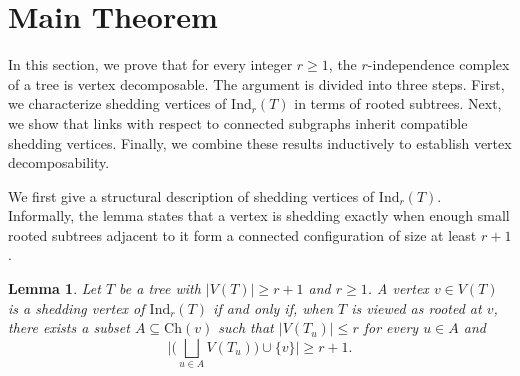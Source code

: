 \documentclass[12pt,reqno]{amsart}
\newtheorem{lemma}[theorem]{Lemma}
\theoremstyle{definition}
\def\Ind{\mathrm{Ind}}
\begin{document}
\section{Main Theorem}\label{sec: 3}

In this section, we prove that for every integer $r \ge 1$, the $r$-independence complex of a tree is vertex decomposable. The argument is divided into three steps. First, we characterize shedding vertices of $\Ind_r(T)$ in terms of rooted subtrees.
Next, we show that links with respect to connected subgraphs
inherit compatible shedding vertices. Finally, we combine these
results inductively to establish vertex decomposability. 

We first give a structural description of shedding vertices of $\Ind_r(T)$. Informally, the lemma states that a vertex is shedding exactly when enough small rooted subtrees adjacent to it form a connected configuration of size at least $r+1$.

\begin{lemma}\label{lem: all shedding vertices}
Let $T$ be a tree with $|V(T)| \ge r+1$ and $r \ge 1$. A vertex $v \in V(T)$ is a shedding vertex of $\Ind_r(T)$ if and only if, when $T$ is viewed as rooted at $v$, there exists a subset $A \subseteq \mathrm{Ch}(v)$ such that $|V(T_u)| \le r$ for every $u \in A$ and 
\[
\Big|\Big(\bigsqcup_{u \in A} V(T_u)\Big) \cup \{v\}\Big| \ge r+1.
\]
\end{lemma}
\end{document}
